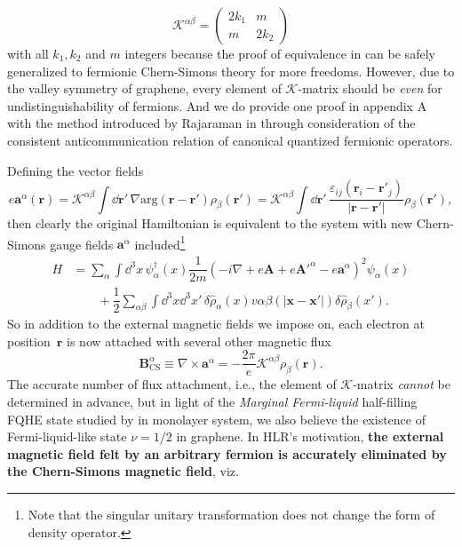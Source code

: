 \documentclass[bachelor,english,numbers]{ustcthesis}
\begin{document}
		\begin{equation}\label{2.2.2}
			\mathcal{K}^{\alpha \beta}=\left(\begin{array}{cc}
				2k_1 & m \\ m & 2k_2
			\end{array}\right)
		\end{equation}
		with all $k_1,k_2$ and $m$ integers because the proof of equivalence in \cite{lopez1991fractional} can be safely generalized to fermionic Chern-Simons theory for more freedoms. However, due to the valley symmetry of graphene, every element of $\mathcal{K}$-matrix should be \emph{even} for undistinguishability of fermions. And we do provide one proof in appendix A with the method introduced by Rajaraman in \cite{rajaraman1997generalized} through consideration of the consistent anticommunication relation of canonical quantized fermionic operators.\par
		Defining the vector fields
		\begin{equation}\label{2.2.3}
			e\bm{a}^\alpha(\bm{r})=\mathcal{K}^{\alpha \beta}\int\dd\bm{r'}\,\nabla\mathrm{arg}(\bm{r}-\bm{r'})\rho_\beta(\bm{r'})=\mathcal{K}^{\alpha\beta}\int\dd\bm{r'}\,\dfrac{\varepsilon_{ij}(\bm{r}_i-\bm{r'}_j)}{|\bm{r}-\bm{r'}|}\rho_\beta(\bm{r'}),
		\end{equation}
		then clearly the original Hamiltonian is equivalent to the system with new Chern-Simons gauge fields $\bm{a}^\alpha$ included\footnote{Note that the singular unitary transformation does not change the form of density operator.} \cite{nagaosa2013quantum}
		\begin{align}\label{2.2.4}
			H&=\sum_\alpha\int\dd^3x\,\psi^\dagger_\alpha(x)\dfrac{1}{2m}\left(-i\nabla+e\bm{A}+e\bm{A'}^\alpha-e\bm{a}^\alpha\right)^2\psi_\alpha(x)\nonumber\\
			&\qquad+\dfrac{1}{2}\sum_{\alpha \beta}\int\dd^3x\dd^3x'\,\delta\hat{\rho}_\alpha(x)v{\alpha \beta}(|\bm{x}-\bm{x'}|)\delta\hat{\rho}_\beta(x').
		\end{align}
		So in addition to the external magnetic fields we impose on, each electron at position~$\bm{r}$ is now attached with several other magnetic flux
		\begin{equation}\label{2.2.5}
			\bm{B}^\alpha_{\text{CS}}\equiv\nabla\times\bm{a}^\alpha=-\dfrac{2\pi}{e}\mathcal{K}^{\alpha \beta}\rho_\beta(\bm{r}).
		\end{equation}
		\indent The accurate number of flux attachment, i.e., the element of $\mathcal{K}$-matrix \emph{cannot} be determined in advance, but in light of the \emph{Marginal Fermi-liquid} half-filling FQHE state studied by \cite{Halperin1995Theory} in monolayer system, we also believe the existence of Fermi-liquid-like state $\nu=1/2$ in graphene. In HLR's motivation, {\bf the external magnetic field felt by an arbitrary fermion is accurately eliminated by the Chern-Simons magnetic field}, viz.
\end{document}
